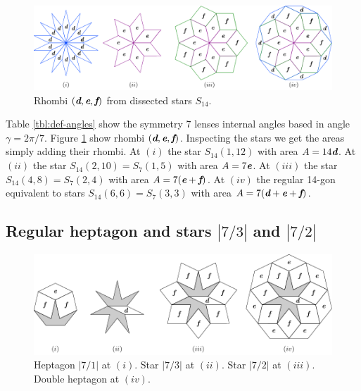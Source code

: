 \documentclass[11pt]{article}
\def\mathbi#1{\textbf{\em #1}}
\begin{document}
\begin{figure}[H]
\centering
\includegraphics[scale=1]{def/rhombi}
\caption{Rhombi $(\mathbi{d},\mathbi{e},\mathbi{f})$ from dissected stars $S_{14}$. }
\label{fig:def-rhombi}
\end{figure}

Table \ref{tbl:def-angles} show the symmetry 7 lenses internal angles based in angle $\gamma = 2\pi/7$.
Figure \ref{fig:def-rhombi} show rhombi $(\mathbi{d},\mathbi{e},\mathbi{f})$. 
Inspecting the stars we get the areas simply adding their rhombi.
At $(i)$ the star $S_{14}(1,12)$ with area $A = 14\mathbi{d}$. 
At $(ii)$ the star $S_{14}(2,10) = S_7(1,5)$ with area $A = 7\mathbi{e}$.
At $(iii)$ the star $S_{14}(4,8) = S_7(2,4)$ with area $A = 7(\mathbi{e} + \mathbi{f})$.
At $(iv)$ the regular 14-gon equivalent to stars $S_{14}(6,6) = S_7(3,3)$ with area $A = 7(\mathbi{d} + \mathbi{e} + \mathbi{f})$.

\subsection{Regular heptagon and stars $|7/3|$ and $|7/2|$}

\begin{figure}[H]
\centering
\includegraphics[scale=1.1]{def/hepta}
\caption{Heptagon $|7/1|$ at $(i)$. Star $|7/3|$ at $(ii)$. Star $|7/2|$ at $(iii)$. Double heptagon at $(iv)$.}
\label{fig:def-hepta}
\end{figure}
\end{document}
